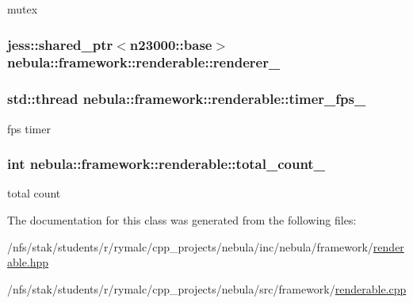 mutex \hypertarget{classnebula_1_1framework_1_1renderable_afbed356edc56ff22bfb194f7953d7db6}{
\subsubsection[{renderer\_\-}]{\setlength{\rightskip}{0pt plus 5cm}jess::shared\_\-ptr$<${\bf n23000::base}$>$ {\bf nebula::framework::renderable::renderer\_\-}}}
\label{classnebula_1_1framework_1_1renderable_afbed356edc56ff22bfb194f7953d7db6}
\hypertarget{classnebula_1_1framework_1_1renderable_ad62bfb2a9f455443be5224818c8bf10d}{
\subsubsection[{timer\_\-fps\_\-}]{\setlength{\rightskip}{0pt plus 5cm}std::thread {\bf nebula::framework::renderable::timer\_\-fps\_\-}}}
\label{classnebula_1_1framework_1_1renderable_ad62bfb2a9f455443be5224818c8bf10d}


fps timer \hypertarget{classnebula_1_1framework_1_1renderable_a1362bec85c1587043dcf1b6a116193bb}{
\subsubsection[{total\_\-count\_\-}]{\setlength{\rightskip}{0pt plus 5cm}int {\bf nebula::framework::renderable::total\_\-count\_\-}}}
\label{classnebula_1_1framework_1_1renderable_a1362bec85c1587043dcf1b6a116193bb}


total count 

The documentation for this class was generated from the following files:\begin{DoxyCompactItemize}
\item 
/nfs/stak/students/r/rymalc/cpp\_\-projects/nebula/inc/nebula/framework/\hyperlink{renderable_8hpp}{renderable.hpp}\item 
/nfs/stak/students/r/rymalc/cpp\_\-projects/nebula/src/framework/\hyperlink{renderable_8cpp}{renderable.cpp}\end{DoxyCompactItemize}
